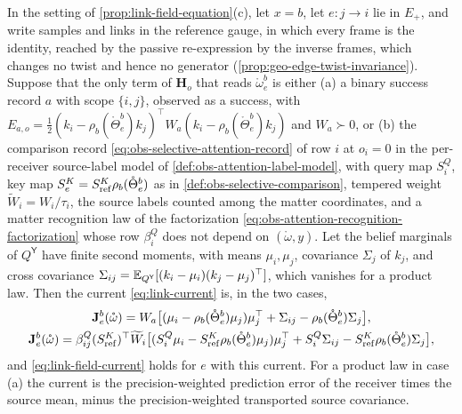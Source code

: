 In the setting of \cref{prop:link-field-equation}(c), let $x=b$, let $e:j\to i$ lie in $E_+$, and write samples
and links in the reference gauge, in which every frame is the identity, reached by the passive
re-expression by the inverse frames, which changes no twist and hence no generator
(\cref{prop:geo-edge-twist-invariance}). Suppose that the only term
of $\mathbf H_o$ that reads $\mathring\omega^b_e$ is either (a) a binary success record $a$ with scope $\{i,j\}$,
observed as a success, with
$E_{a,o}=\frac12(k_i-\rho_b(\mathring\Theta^b_e)k_j)^\top W_a(k_i-\rho_b(\mathring\Theta^b_e)k_j)$ and
$W_a\succ0$, or (b) the comparison record \eqref{eq:obs-selective-attention-record} of row $i$ at $o_i=0$ in
the per-receiver source-label model of \cref{def:obs-attention-label-model}, with query map $S^Q_i$, key map
$S^K_e=S^K_{\rm ref}\rho_b(\mathring\Theta^b_e)$ as in \cref{def:obs-selective-comparison}, tempered weight
$\widetilde W_i=W_i/\tau_i$, the source labels counted among the matter coordinates, and a matter recognition
law of the factorization \eqref{eq:obs-attention-recognition-factorization} whose row $\beta^Q_i$ does not
depend on $(\mathring\omega,y)$. Let the belief marginals of $Q^{\mathsf Y}$ have finite second moments, with
means $\mu_i,\mu_j$, covariance $\Sigma_j$ of $k_j$, and cross covariance
$\Sigma_{ij}=\mathbb E_{Q^{\mathsf Y}}[(k_i-\mu_i)(k_j-\mu_j)^\top]$, which vanishes for a product law. Then the
current \eqref{eq:link-current} is, in the two cases,
\begin{gather}
\mathbf J^b_e(\mathring\omega)
=W_a\bigl[(\mu_i-\rho_b(\mathring\Theta^b_e)\mu_j)\mu_j^\top+\Sigma_{ij}-\rho_b(\mathring\Theta^b_e)\Sigma_j\bigr],
\label{eq:link-delta-current}\\
\mathbf J^b_e(\mathring\omega)
=\beta^Q_{ij}(S^K_{\rm ref})^\top\widetilde W_i\bigl[(S^Q_i\mu_i-S^K_{\rm ref}\rho_b(\mathring\Theta^b_e)\mu_j)\mu_j^\top
+S^Q_i\Sigma_{ij}-S^K_{\rm ref}\rho_b(\mathring\Theta^b_e)\Sigma_j\bigr],
\label{eq:link-delta-current-attention}
\end{gather}
and \eqref{eq:link-field-current} holds for $e$ with this current. For a product law in case (a) the
current is the precision-weighted prediction error of the receiver times the source mean, minus the
precision-weighted transported source covariance. 

